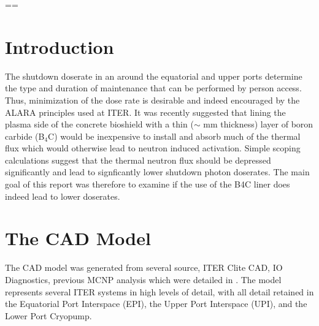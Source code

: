 \documentclass[12pt]{article}
\begin{document}
\maketitle
\newpage
==\tableofcontents
\newpage
\section{Introduction}
The shutdown doserate in an around the equatorial and upper ports determine the type and duration of maintenance that can be
performed by person access. Thus, minimization of the dose rate is desirable and indeed encouraged by the ALARA principles used
at ITER. It was recently suggested that lining the plasma side of the concrete bioshield with a thin ($\sim$ mm thickness) layer of boron carbide (B$_4$C) would be inexpensive to install and absorb much of the thermal flux which would otherwise lead to neutron
induced activation. Simple scoping calculations suggest that the thermal neutron flux should be depressed significantly and lead
to signficantly lower shutdown photon doserates. The main goal of this report was therefore to examine if the use of the B4C liner
does indeed lead to lower doserates.

\section{The CAD Model}
The CAD model was generated from several source, ITER Clite CAD, IO Diagnostics, previous MCNP analysis which were detailed in \cite{cad_origination}. The model represents several ITER systems in high levels of detail, with all detail retained in the Equatorial Port Interspace (EPI), the  Upper Port Interspace (UPI), and the Lower Port Cryopump.
\end{document}
